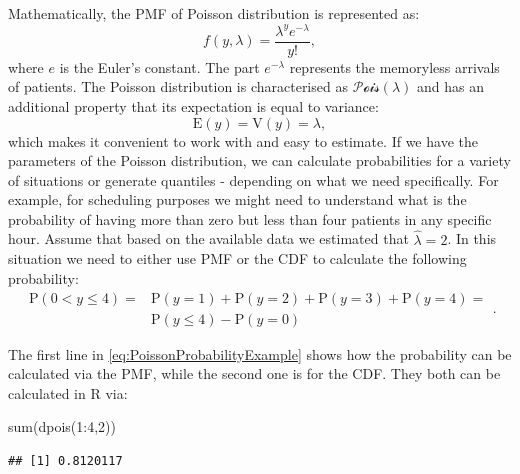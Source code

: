 \documentclass[
]{book}
\newenvironment{Shaded}{\begin{snugshade}}{\end{snugshade}}
\newcommand{\DecValTok}[1]{\textcolor[rgb]{0.00,0.00,0.81}{#1}}
\newcommand{\FunctionTok}[1]{\textcolor[rgb]{0.00,0.00,0.00}{#1}}
\newcommand{\NormalTok}[1]{#1}
\newcommand{\SpecialCharTok}[1]{\textcolor[rgb]{0.00,0.00,0.00}{#1}}
\theoremstyle{definition}
\theoremstyle{definition}
\theoremstyle{definition}
\theoremstyle{definition}
\theoremstyle{remark}
\begin{document}
Mathematically, the PMF of Poisson distribution is represented as:
\begin{equation}
    f(y, \lambda) = \frac{\lambda^y e^{-\lambda}}{y!} ,
    \label{eq:PoissonPMF}
\end{equation}
where \(e\) is the Euler's constant. The part \(e^{-\lambda}\) represents the memoryless arrivals of patients. The Poisson distribution is characterised as \(\mathcal{Pois}(\lambda)\) and has an additional property that its expectation is equal to variance:
\begin{equation}
    \mathrm{E}(y) = \mathrm{V}(y) = \lambda ,
    \label{eq:PoissonMean}
\end{equation}
which makes it convenient to work with and easy to estimate. If we have the parameters of the Poisson distribution, we can calculate probabilities for a variety of situations or generate quantiles - depending on what we need specifically. For example, for scheduling purposes we might need to understand what is the probability of having more than zero but less than four patients in any specific hour. Assume that based on the available data we estimated that \(\hat{\lambda}=2\). In this situation we need to either use PMF or the CDF to calculate the following probability:
\begin{equation}
    \begin{aligned}
        \mathrm{P}(0 < y \leq 4) = & \mathrm{P}(y=1) + \mathrm{P}(y=2) + \mathrm{P}(y=3) + \mathrm{P}(y=4) = \\
                                   & \mathrm{P}(y \leq 4) - \mathrm{P}(y=0)
    \end{aligned} .
    \label{eq:PoissonProbabilityExample}
\end{equation}

The first line in \eqref{eq:PoissonProbabilityExample} shows how the probability can be calculated via the PMF, while the second one is for the CDF. They both can be calculated in R via:

\begin{Shaded}
\begin{Highlighting}[]
\FunctionTok{sum}\NormalTok{(}\FunctionTok{dpois}\NormalTok{(}\DecValTok{1}\SpecialCharTok{:}\DecValTok{4}\NormalTok{,}\DecValTok{2}\NormalTok{))}
\end{Highlighting}
\end{Shaded}

\begin{verbatim}
## [1] 0.8120117
\end{verbatim}
\end{document}
